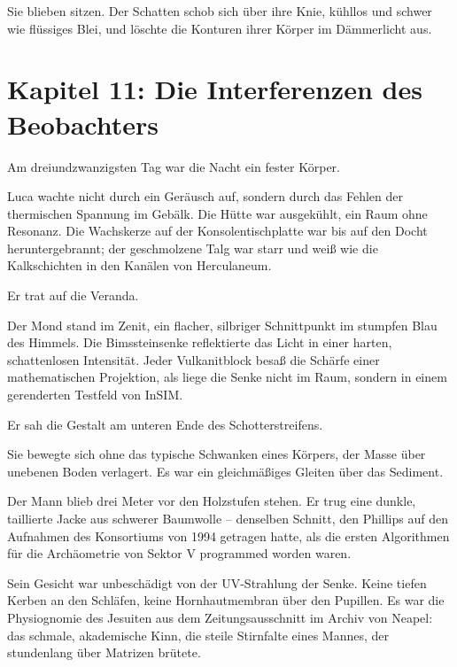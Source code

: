 \documentclass[
  ngerman,
]{article}
\begin{document}
Sie blieben sitzen. Der Schatten schob sich über ihre Knie, kühllos und
schwer wie flüssiges Blei, und löschte die Konturen ihrer Körper im
Dämmerlicht aus.

\section{}\label{section-4}

\section{\texorpdfstring{\textbf{Kapitel 11: Die Interferenzen des
Beobachters}}{Kapitel 11: Die Interferenzen des Beobachters}}\label{kapitel-11-die-interferenzen-des-beobachters}

Am dreiundzwanzigsten Tag war die Nacht ein fester Körper.

Luca wachte nicht durch ein Geräusch auf, sondern durch das Fehlen der
thermischen Spannung im Gebälk. Die Hütte war ausgekühlt, ein Raum ohne
Resonanz. Die Wachskerze auf der Konsolentischplatte war bis auf den
Docht heruntergebrannt; der geschmolzene Talg war starr und weiß wie die
Kalkschichten in den Kanälen von Herculaneum.

Er trat auf die Veranda.

Der Mond stand im Zenit, ein flacher, silbriger Schnittpunkt im stumpfen
Blau des Himmels. Die Bimssteinsenke reflektierte das Licht in einer
harten, schattenlosen Intensität. Jeder Vulkanitblock besaß die Schärfe
einer mathematischen Projektion, als liege die Senke nicht im Raum,
sondern in einem gerenderten Testfeld von InSIM.

Er sah die Gestalt am unteren Ende des Schotterstreifens.

Sie bewegte sich ohne das typische Schwanken eines Körpers, der Masse
über unebenen Boden verlagert. Es war ein gleichmäßiges Gleiten über das
Sediment.

Der Mann blieb drei Meter vor den Holzstufen stehen. Er trug eine
dunkle, taillierte Jacke aus schwerer Baumwolle -- denselben Schnitt,
den Phillips auf den Aufnahmen des Konsortiums von 1994 getragen hatte,
als die ersten Algorithmen für die Archäometrie von Sektor V programmed
worden waren.

Sein Gesicht war unbeschädigt von der UV-Strahlung der Senke. Keine
tiefen Kerben an den Schläfen, keine Hornhautmembran über den Pupillen.
Es war die Physiognomie des Jesuiten aus dem Zeitungsausschnitt im
Archiv von Neapel: das schmale, akademische Kinn, die steile Stirnfalte
eines Mannes, der stundenlang über Matrizen brütete.
\end{document}

